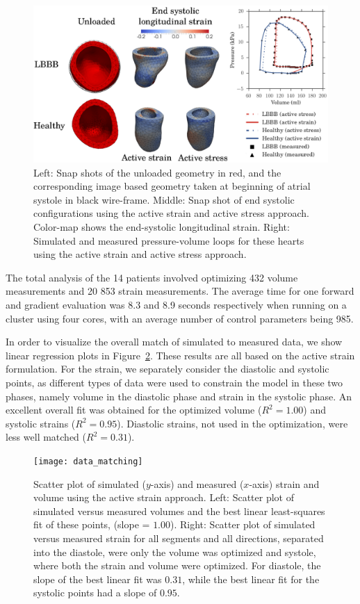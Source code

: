 \begin{figure}[htbp]
  \centering
  \includegraphics[width=\textwidth]{generic_result}
  \caption{Left: Snap shots of the unloaded geometry in red, and the
    corresponding image based geometry taken at beginning of atrial
    systole in black wire-frame. Middle: Snap shot of end systolic
    configurations using the active strain and active stress approach.
    Color-map shows the end-systolic longitudinal strain.
    Right: Simulated and measured pressure-volume loops for
    these hearts using the active strain and active stress approach.}  
  \label{fig:generic_result}
\end{figure}


The total analysis of the 14 patients involved optimizing 432 volume
measurements and 20 853 strain measurements. The average time for one
forward and gradient evaluation was 8.3 and 8.9 seconds respectively
when running on a cluster using four cores, with an average number of
control parameters being 985.

In order to visualize the overall match of simulated to measured data,
we show linear regression plots in
Figure~\ref{fig:data_matching}. These results are all based on the
active strain formulation. For
the strain, we separately consider the diastolic and systolic points,
as different types of data were used to  constrain the model in these
two phases, namely volume in the diastolic phase and strain in the
systolic phase. An excellent overall fit was obtained for the optimized
volume ($R^2=1.00$) and systolic strains ($R^2=0.95$). 
Diastolic strains, not used in the optimization, were less well
matched ($R^2=0.31$).



\begin{figure}[htbp]
  \centering
  \texttt{[image: data\_matching]}
  \caption{Scatter plot of simulated ($y$-axis) and measured
    ($x$-axis) strain and volume using the active
    strain approach. Left: Scatter plot of simulated versus
    measured volumes and the best linear least-squares fit of these
    points, (slope = $1.00$). Right: Scatter plot of simulated versus
    measured strain for all segments and all directions, separated
    into the diastole, were only the volume was optimized and systole,
    where both the strain and volume were optimized. For diastole, the slope of
    the best linear fit was $0.31$, while the best linear fit for the
    systolic points had a slope of $0.95$.}
  \label{fig:data_matching}
\end{figure}


